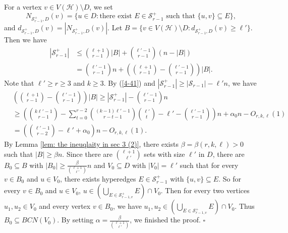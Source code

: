 \documentclass[12pt]{article}%
\newenvironment{proof}{{\noindent\it Proof.}}{\hfill $\square$\par}
\newcommand{\mh}{\mathcal{H}}
\begin{document}
\begin{proof}
     For a vertex $v\in V(\mh)\setminus D$, we set $$N_{\mathcal{S}_{r-1}^+,D}(v)=\{u\in D: \text{there exist $E\in \mathcal{S}_{r-1}^+$ such that $\{u,v\}\subseteq E$}\},$$ and  $d_{\mathcal{S}_{r-1}^+,D}(v)=|N_{\mathcal{S}_{r-1}^+,D}(v)|$.
    Let $B=\{v\in V(\mh)\setminus D:d_{\mathcal{S}_{r-1}^+,D}(v)\geq \ell'\}$. Then we have
     \begin{equation*}
         \begin{aligned}
             \left|\mathcal{S}_{r-1}^+\right|&\leq \binom{\ell+1}{r-1}|B|+\binom{\ell'-1}{r-1}(n-|B|)\\
             &= \binom{\ell'-1}{r-1}n+\left( \binom{\ell+1}{r-1}-\binom{\ell'-1}{r-1} \right)|B|.
         \end{aligned}
     \end{equation*}
     Note that  $\ell'\geq r\geq 3$ and $k\geq 3$. By (\ref{4-41}) and $|\mathcal{S}_{r-1}^+|\geq |\mathcal{S}_{r-1}|-\ell' n$, we have
      \begin{equation*}
         \begin{aligned}
             &\left( \binom{\ell+1}{r-1}-\binom{\ell'-1}{r-1} \right)|B|\geq \left| \mathcal{S}_{r-1}^+\right|-\binom{\ell'-1}{r-1}n\\
             &\geq \left(\binom{k\ell'-1}{r-1}-\sum_{t=0}^{r-2}\binom{(k-1)\ell'-1}{r-t-1}\binom{\ell'}{t}-\ell'-\binom{\ell'-1}{r-1} \right)n
             +\alpha_0 n-O_{r,k,\ell}(1)   \\
             &= \left(\binom{\ell'-1}{r-2}-\ell'+\alpha_0 \right)n-O_{r,k,\ell}(1).
         \end{aligned}
     \end{equation*}
     By Lemma \ref{lem: the ineuqlaity in sec 3 (2)}, there exists $\beta=\beta(r,k,\ell)>0$ such that $|B|\geq \beta n$.
     Since there are $\binom{\ell+1}{\ell'}$ sets with size $\ell'$ in $D$, there are $B_0\subseteq B$ with  $|B_0|\ge\frac{\beta }{\binom{\ell+1}{\ell'}}n$ and $V_0\subseteq D$ with $|V_0|=\ell'$ such that for every $v\in B_0$ and $u\in V_0$, there exists hyperedges $E\in \mathcal{S}_{r-1}^+$ with $\{u,v\}\subseteq E$.
So for every $v\in B_0$ and $u\in V_0$, $u\in \left(\bigcup_{E\in \mathcal{S}_{r-1,v}^+}E\right)\cap V_0$.
     Then for every two vertices $u_1,u_2\in V_0$ and every vertex $v\in B_0$, we have $u_1,u_2\in  \left(\bigcup_{E\in \mathcal{S}_{r-1,v}^+}E\right)\cap V_0$. Thus $B_0\subseteq BCN(V_0)$.
    By setting $\alpha=\frac{\beta}{\binom{\ell+1}{\ell'}}$, we finished the proof.
 \end{proof}
\end{document}
